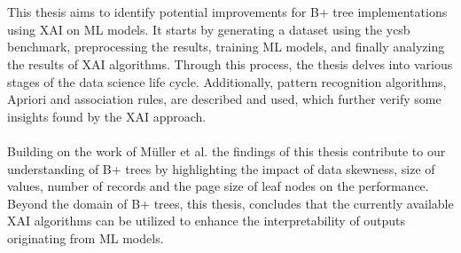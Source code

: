 \chapter{\abstractname}

This thesis aims to identify potential improvements for B+ tree implementations using \ac{XAI} on \ac{ML} models. It starts by generating a dataset using the \ac{ycsb} benchmark, preprocessing the results, training \ac{ML} models, and finally analyzing the results of \ac{XAI} algorithms. Through this process, the thesis delves into various stages of the data science life cycle. Additionally, pattern recognition algorithms, Apriori and association rules, are described and used, which further verify some insights found by the \ac{XAI} approach.
\\\\
Building on the work of Müller et al. \parencite{mueller2024} the findings of this thesis contribute to our understanding of B+ trees by highlighting the impact of data skewness, size of values, number of records and the page size of leaf nodes on the performance. Beyond the domain of B+ trees, this thesis, concludes that the currently available \ac{XAI} algorithms can be utilized to enhance the interpretability of outputs originating from \ac{ML} models.   


